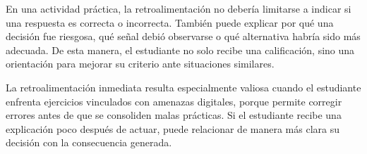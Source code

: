 En una actividad práctica, la retroalimentación no debería limitarse a indicar si una respuesta es correcta o incorrecta. También puede explicar por qué una decisión fue riesgosa, qué señal debió observarse o qué alternativa habría sido más adecuada. De esta manera, el estudiante no solo recibe una calificación, sino una orientación para mejorar su criterio ante situaciones similares.

La retroalimentación inmediata resulta especialmente valiosa cuando el estudiante enfrenta ejercicios vinculados con amenazas digitales, porque permite corregir errores antes de que se consoliden malas prácticas. Si el estudiante recibe una explicación poco después de actuar, puede relacionar de manera más clara su decisión con la consecuencia generada.
